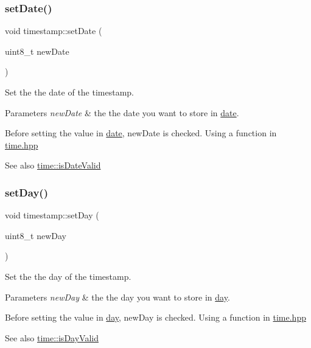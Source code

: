 \subsubsection{\texorpdfstring{set\+Date()}{setDate()}}
{\footnotesize\ttfamily void timestamp\+::set\+Date (\begin{DoxyParamCaption}\item[{uint8\+\_\+t}]{new\+Date }\end{DoxyParamCaption})}



Set the the date of the timestamp. 


\begin{DoxyParams}{Parameters}
{\em new\+Date} & the the date you want to store in \mbox{\hyperlink{classtimestamp_a7eb2eee5f6ef4258aab7779a639a93fd}{date}}.\\
\hline
\end{DoxyParams}
Before setting the value in \mbox{\hyperlink{classtimestamp_a7eb2eee5f6ef4258aab7779a639a93fd}{date}}, new\+Date is checked. Using a function in \mbox{\hyperlink{time_8hpp_source}{time.\+hpp}} \begin{DoxySeeAlso}{See also}
\mbox{\hyperlink{classtime_aa678e8f53a12adda2f807e6a44ebc46d}{time\+::is\+Date\+Valid}} 
\end{DoxySeeAlso}
\mbox{\label{classtimestamp_af280dd8ed37274b31a548619f21dddd9}} 
\subsubsection{\texorpdfstring{set\+Day()}{setDay()}}
{\footnotesize\ttfamily void timestamp\+::set\+Day (\begin{DoxyParamCaption}\item[{uint8\+\_\+t}]{new\+Day }\end{DoxyParamCaption})}



Set the the day of the timestamp. 


\begin{DoxyParams}{Parameters}
{\em new\+Day} & the the day you want to store in \mbox{\hyperlink{classtimestamp_a0102d6c44b2cc194a8186a42ff2bd58b}{day}}.\\
\hline
\end{DoxyParams}
Before setting the value in \mbox{\hyperlink{classtimestamp_a0102d6c44b2cc194a8186a42ff2bd58b}{day}}, new\+Day is checked. Using a function in \mbox{\hyperlink{time_8hpp_source}{time.\+hpp}} \begin{DoxySeeAlso}{See also}
\mbox{\hyperlink{classtime_a126cf22d6b3a7a36603e2cb390082d2f}{time\+::is\+Day\+Valid}} 
\end{DoxySeeAlso}
\mbox{\label{classtimestamp_ae074684cb0c1f937c9ab985692522217}} 
